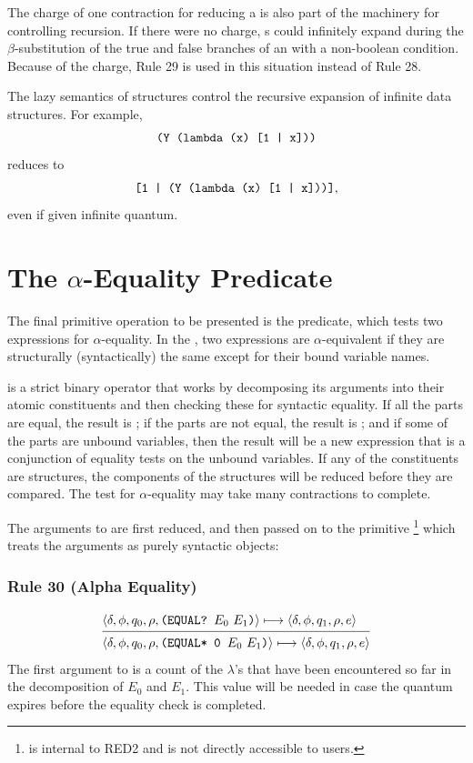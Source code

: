 The charge of one contraction for reducing a  is also part of the
machinery for controlling recursion. If there were no charge, s could
infinitely expand during the \(\beta\)-substitution of the true and false
branches of an  with a non-boolean condition. Because of the charge,
Rule 29 is used in this situation instead of Rule 28.

The lazy semantics of structures control the recursive expansion of infinite
data structures. For example,
\[
\texttt{(Y (lambda (x) [1 | x]))}
\]
reduces to
\[
\texttt{[1 | (Y (lambda (x) [1 | x]))]},
\]
even if given infinite quantum.

\section{The \(\alpha\)-Equality Predicate}

The final primitive operation to be presented is the  predicate,
which tests two expressions for \(\alpha\)-equality. In the \lambdacalculus, two
expressions are \(\alpha\)-equivalent if they are structurally (syntactically)
the same except for their bound variable names.

 is a strict binary operator that works by decomposing its
arguments into their atomic constituents and then checking these for syntactic
equality. If all the parts are equal, the result is ; if the parts
are not equal, the result is ; and if some of the parts are unbound
variables, then the result will be a new expression that is a conjunction of
equality tests on the unbound variables. If any of the constituents are
structures, the components of the structures will be reduced before they are
compared. The test for \(\alpha\)-equality may take many contractions to
complete.

The arguments to  are first reduced, and then passed on to the
primitive \footnote{ is internal to RED2 and is not
directly accessible to users.} which treats the arguments as purely syntactic
objects:

\subsubsection*{Rule 30 (Alpha Equality)}
\[
\semanticrule{
\cfg{\delta}{\phi}{q_0}{\rho}{\THOR{(EQUAL? }E_0\ E_1\THOR{)}}\redsto
\cfg{\delta}{\phi}{q_1}{\rho}{e}
}{
\cfg{\delta}{\phi}{q_0}{\rho}{\THOR{(EQUAL* 0 }E_0\ E_1\THOR{)}}\redsto
\cfg{\delta}{\phi}{q_1}{\rho}{e}
}
\]
The first argument to  is a count of the \(\lambda\)'s that have
been encountered so far in the decomposition of \(E_0\) and \(E_1\). This value
will be needed in case the quantum expires before the equality check is
completed.

